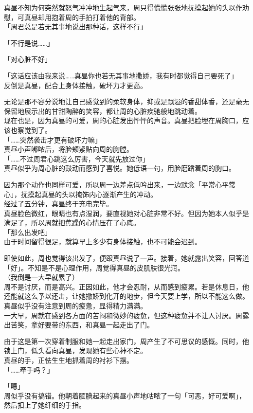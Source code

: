 真昼不知为何突然就怒气冲冲地生起气来，周只得慌慌张张地抚摸起她的头以作劝慰，可真昼却用抱着周的手拍打着他的背部。\\

「周君总是若无其事地说出那种话，这样不行」

「不行是说……」

「对心脏不好」

「这话应该由我来说……真昼你也若无其事地撒娇，我有时都觉得自己要死了」\\

反倒是真昼，配合上身体接触，破坏力才更高。

无论是那不容分说地让自己感觉到的柔软身体，抑或是飘溢的香甜体香，还是毫无保留地展示出的甘甜陶醉的笑容，都让周的心脏疾驰般地跳动着。\\

现在也是，因为真昼的可爱，周的心脏发出怦怦的声音。真昼把脸埋在周胸口，应该也察觉到了。\\

「……突然袭击才更有破坏力嘛」\\

真昼小声嘟哝后，将脸颊紧贴向周的胸膛。\\

「……不过周君心跳这么厉害，今天就先放过你」\\

真昼似乎为周心脏的鼓动而感到了喜悦。她低语一句，用脸磨蹭着周的胸口。

因为那个动作也同样可爱，所以周一边差点低吟出来，一边默念「平常心平常心」，抚摸起真昼的头以掩饰内心逐渐产生的冲动。\\

经过了五分钟，真昼终于充电完毕。\\

真昼脸色微红，眼睛也有点湿润，要直视她对心脏非常不好。但因为她本人似乎是满足了，所以周就把焦躁的心情压在了心底。\\

「那么出发吧」\\

由于时间留得很足，就算早上多少有身体接触，也不可能会迟到。

即使如此，周也觉得该出发了，便跟真昼说了一声。接着，她就露出笑容，回答道「好」。不知是不是心理作用，周觉得真昼的皮肌肤很光润。\\

（我倒是一大早就累了）\\

周不是讨厌，而是高兴。正因如此，他才会忍耐，从而感到疲累。若是休息日，他还能就这么予以还击，让她撒娇到化开的地步，但今天要上学，所以不能这么做。\\

真昼似乎没有注意到周的疲惫，显得精力满满。\\

一大早，周就在感到各方面的苦闷和微妙的疲惫，但这种疲惫并不让人讨厌。周露出苦笑，拿好要带的东西，和真昼一起走出了门。

由于这是第一次穿着制服和她一起走出家门，周产生了不可思议的感慨。同时，他锁上门，低头看向真昼，发现她有些心神不定。\\

真昼的手，正怯生生地抓着周的衬衫下摆。\\

「……牵手吗？」

「嗯」\\

周似乎没有搞错。他朝着腼腆起来的真昼小声地咕哝了一句「可恶，好可爱啊」，然后扣上了她纤细的手指。
